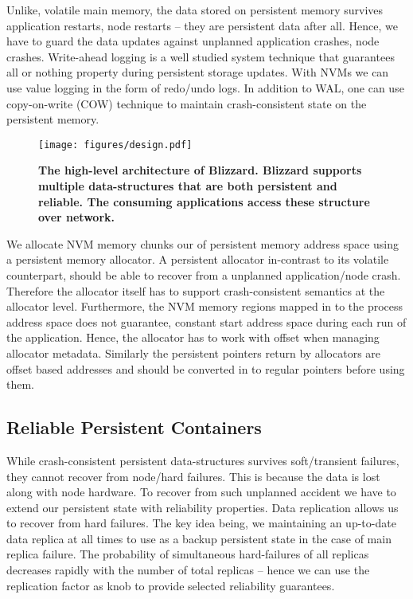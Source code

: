 Unlike, volatile main memory, the data stored on persistent memory survives application restarts,
node restarts -- they are persistent data after all. Hence, we have to guard the data updates 
against unplanned application crashes, node crashes. Write-ahead logging is a well studied
system technique that guarantees all or nothing property during persistent storage updates.
With NVMs we can use value logging in the form of redo/undo logs. In addition to WAL, one 
can use copy-on-write (COW) technique to maintain crash-consistent state on the persistent memory. 

\begin{figure}[tbp]   
	\centering
	\texttt{[image: figures/design.pdf]} 
	\caption{\bf The high-level architecture of Blizzard. Blizzard supports multiple data-structures that are both
	persistent and reliable. The consuming applications access these structure over network.} 
	\label{arch} 
\end{figure}

We allocate NVM memory chunks our of persistent memory address space using a persistent memory allocator.
A persistent allocator in-contrast to its volatile counterpart, should be able to recover from a unplanned
application/node crash. Therefore the allocator itself has to support crash-consistent semantics at the 
allocator level. Furthermore, the NVM memory regions mapped in to the process address space does not
guarantee, constant start address space during each run of the application. Hence, the allocator has to 
work with offset when managing allocator metadata. Similarly the persistent pointers return by allocators
are offset based addresses and should be converted in to regular pointers before using them.

\subsection{Reliable Persistent Containers}

While crash-consistent persistent data-structures survives soft/transient failures, they cannot
recover from node/hard failures. This is because the data is lost along with node hardware.
To recover from such unplanned accident we have to extend our persistent state with reliability
properties. Data replication allows us to recover from hard failures. The key idea being, we maintaining
an up-to-date data replica at all times to use as a backup persistent state in the case of main
replica failure. The probability of simultaneous hard-failures of all replicas decreases rapidly
with the number of total replicas -- hence we can use the replication factor as knob to provide
selected reliability guarantees.

